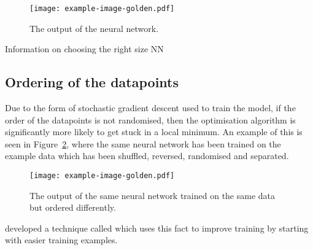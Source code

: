 \begin{figure}[htbp]
	\centering
	\texttt{[image: example-image-golden.pdf]}
	\caption{The output of the neural network.}
	\label{fig:ann-output}
\end{figure}

\begin{todo}
Information on choosing the right size NN
\end{todo}

\subsection{Ordering of the datapoints}

Due to the form of stochastic gradient descent used to train the model, if the order of the datapoints is not randomised, then the optimisation algorithm is significantly more likely to get stuck in a local minimum.
An example of this is seen in Figure~\ref{fig:ann-order}, where the same neural network has been trained on the example data which has been shuffled, reversed, randomised and separated.

\begin{figure}[htbp]
	\centering
	\texttt{[image: example-image-golden.pdf]}
	\caption{The output of the same neural network trained on the same data but ordered differently.}
	\label{fig:ann-order}
\end{figure}

\textcite{bengio2009} developed a technique called  which uses this fact to improve training by starting with easier training examples.
